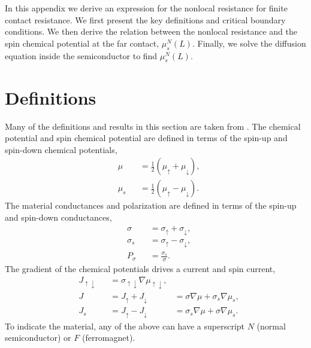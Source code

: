 \label{s:appendix:nonlocal_resistance}
In this appendix we derive an expression for
the nonlocal resistance for finite contact resistance.
We first present the key definitions and critical boundary conditions.
We then derive the relation between the nonlocal resistance
and the spin chemical potential at the far contact, $μ_s^N (L)$.
Finally, we solve the diffusion equation
inside the semiconductor to find $μ_s^N (L)$.

\section{Definitions}

Many of the definitions and results in this section are taken from
\cite{ActaPhysicaSlovaca.57.4_5.565-907}.
The chemical potential and spin chemical potential are defined in terms
of the spin-up and spin-down chemical potentials,
\begin{subequations}\label{eq:potentials}
  \begin{alignat}{2}
    & μ   && = \frac{1}{2} \left( μ_↑ + μ_↓ \right), \\
    & μ_s && = \frac{1}{2} \left( μ_↑ - μ_↓ \right).
  \end{alignat}
\end{subequations}
The material conductances and polarization are defined in terms
of the spin-up and spin-down conductances,
\begin{subequations}\label{eq:conductances}
  \begin{alignat}{2}
    & σ   && = σ_↑ + σ_↓, \\
    & σ_s && = σ_↑ - σ_↓,
    \\
    \label{eq:material.polarization}
    & P_σ && = \frac{σ_s}{σ}.
  \end{alignat}
\end{subequations}
The gradient of the chemical potentials drives a current and spin current,
\begin{subequations}\label{eq:currents}
  \begin{alignat}{3}
    & J_{↑↓} && = σ_{↑↓} ∇μ_{↑↓},
    \\
    \label{eq:currents.current}
    & J      && = J_↑ + J_↓ & = σ   ∇μ + σ_s ∇μ_s,
    \\
    \label{eq:currents.spincurrent}
    & J_s    && = J_↑ - J_↓ & = σ_s ∇μ + σ   ∇μ_s.
  \end{alignat}
\end{subequations}
To indicate the material, any of the above can have a superscript
$N$ (normal semiconductor) or $F$ (ferromagnet).

